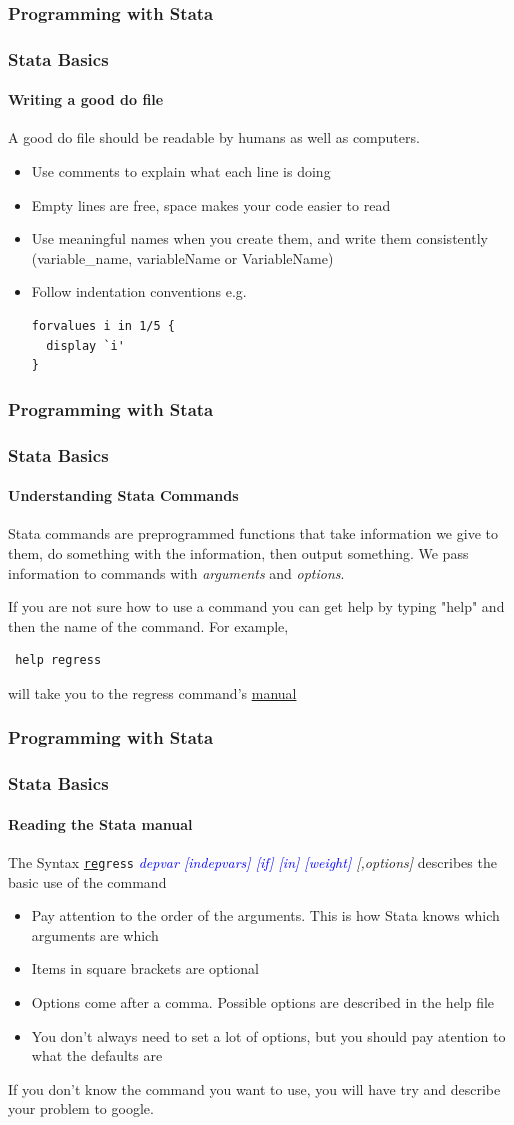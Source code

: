 \documentclass{beamer}
\begin{document}
\begin{frame}[fragile]
  \frametitle{Programming with Stata}
  \frametitle{Stata Basics}
  \framesubtitle{Writing a good do file}
  A good do file should be readable by humans as well as computers.
  \begin{itemize}
    \item Use comments to explain what each line is doing
    \item Empty lines are free, space makes your code easier to read
    \item Use meaningful names when you create them, and write them consistently (variable\_name, variableName or VariableName)
    \item Follow indentation conventions e.g.
    \begin{verbatim}
forvalues i in 1/5 {
  display `i'
}
    \end{verbatim}
  \end{itemize}
\end{frame}

\begin{frame}[fragile]
  \frametitle{Programming with Stata}
  \frametitle{Stata Basics}
  \framesubtitle{Understanding Stata Commands}
  Stata commands are preprogrammed functions that take information we give to them, do something with the information, then output something. We pass information to commands with \textit{arguments} and \textit{options}.
  
  If you are not sure how to use a command you can get help by typing "help" and then the name of the command. For example,
  \begin{verbatim} help regress \end{verbatim}
  will take you to the regress command's \href{http://www.stata.com/manuals13/rregress.pdf}{manual}
\end{frame}

\begin{frame}
  \frametitle{Programming with Stata}
  \frametitle{Stata Basics}
  \framesubtitle{Reading the Stata manual}
  The Syntax \texttt{\underline{reg}ress} \textit{\textcolor{blue}{depvar [indepvars] [if] [in] [weight]} [,options]} describes the basic use of the command
  \begin{itemize}
    \item Pay attention to the order of the arguments. This is how Stata knows which arguments are which
    \item Items in square brackets are optional
    \item Options come after a comma. Possible options are described in the help file
    \item You don't always need to set a lot of options, but you should pay atention to what the defaults are
  \end{itemize}
  If you don't know the command you want to use, you will have try and describe your problem to google.
\end{frame}
\end{document}
